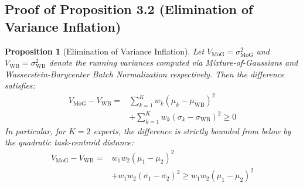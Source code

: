 \documentclass{article}
\theoremstyle{plain}
\newtheorem{proposition}[theorem]{Proposition}
\theoremstyle{definition}
\theoremstyle{remark}
\begin{document}
\subsection{Proof of Proposition 3.2 (Elimination of Variance Inflation)}
\label{app:proof_prop2}

\begin{proposition}[Elimination of Variance Inflation]
Let $V_{\text{MoG}} = \sigma^2_{\text{MoG}}$ and $V_{\text{WB}} = \sigma^2_{\text{WB}}$ denote the running variances computed via Mixture-of-Gaussians and Wasserstein-Barycenter Batch Normalization respectively. Then the difference satisfies:
\begin{equation}
\begin{split}
  V_{\text{MoG}} - V_{\text{WB}} = &\sum_{k=1}^K w_k (\mu_k - \mu_{\text{WB}})^2 \\
  &+ \sum_{k=1}^K w_k (\sigma_k - \sigma_{\text{WB}})^2 \geq 0
\end{split}
\end{equation}
In particular, for $K=2$ experts, the difference is strictly bounded from below by the quadratic task-centroid distance:
\begin{equation}
\begin{split}
  V_{\text{MoG}} - V_{\text{WB}} = &w_1 w_2 (\mu_1 - \mu_2)^2 \\
  &+ w_1 w_2 (\sigma_1 - \sigma_2)^2 \geq w_1 w_2 (\mu_1 - \mu_2)^2
\end{split}
\end{equation}
\end{proposition}
\end{document}
